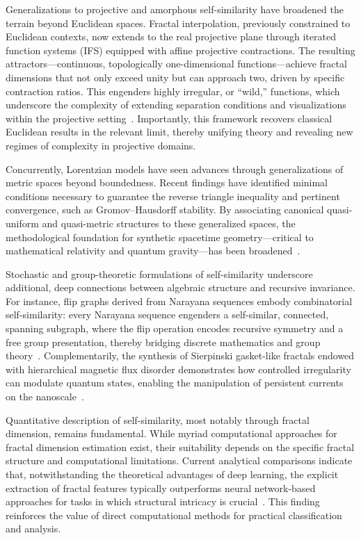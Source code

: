 \documentclass[sigconf]{acmart}
\begin{document}
Generalizations to projective and amorphous self-similarity have broadened the terrain beyond Euclidean spaces. Fractal interpolation, previously constrained to Euclidean contexts, now extends to the real projective plane through iterated function systems (IFS) equipped with affine projective contractions. The resulting attractors—continuous, topologically one-dimensional functions—achieve fractal dimensions that not only exceed unity but can approach two, driven by specific contraction ratios. This engenders highly irregular, or ``wild,'' functions, which underscore the complexity of extending separation conditions and visualizations within the projective setting~\cite{ref30}. Importantly, this framework recovers classical Euclidean results in the relevant limit, thereby unifying theory and revealing new regimes of complexity in projective domains.

Concurrently, Lorentzian models have seen advances through generalizations of metric spaces beyond boundedness. Recent findings have identified minimal conditions necessary to guarantee the reverse triangle inequality and pertinent convergence, such as Gromov--Hausdorff stability. By associating canonical quasi-uniform and quasi-metric structures to these generalized spaces, the methodological foundation for synthetic spacetime geometry—critical to mathematical relativity and quantum gravity—has been broadened~\cite{ref33}.

Stochastic and group-theoretic formulations of self-similarity underscore additional, deep connections between algebraic structure and recursive invariance. For instance, flip graphs derived from Narayana sequences embody combinatorial self-similarity: every Narayana sequence engenders a self-similar, connected, spanning subgraph, where the flip operation encodes recursive symmetry and a free group presentation, thereby bridging discrete mathematics and group theory~\cite{ref42}. Complementarily, the synthesis of Sierpinski gasket-like fractals endowed with hierarchical magnetic flux disorder demonstrates how controlled irregularity can modulate quantum states, enabling the manipulation of persistent currents on the nanoscale~\cite{ref51}.

Quantitative description of self-similarity, most notably through fractal dimension, remains fundamental. While myriad computational approaches for fractal dimension estimation exist, their suitability depends on the specific fractal structure and computational limitations. Current analytical comparisons indicate that, notwithstanding the theoretical advantages of deep learning, the explicit extraction of fractal features typically outperforms neural network-based approaches for tasks in which structural intricacy is crucial~\cite{ref37}. This finding reinforces the value of direct computational methods for practical classification and analysis.
\end{document}
